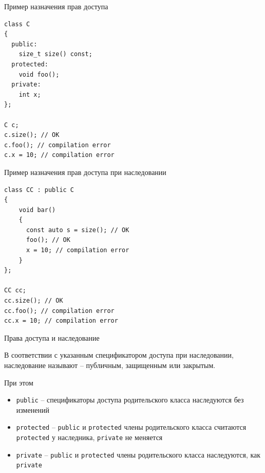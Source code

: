 \documentclass[unknownkeysallowed,xcolor=table]{beamer}
\begin{document}
\begin{frame}[fragile]{Пример назначения прав доступа}

\begin{lstlisting}
class C
{
  public:
    size_t size() const;
  protected:
    void foo();
  private:
    int x;
};

C c;
c.size(); // OK
c.foo(); // compilation error
c.x = 10; // compilation error
\end{lstlisting}

\end{frame}

\begin{frame}[fragile]{Пример назначения прав доступа при наследовании}

\begin{lstlisting}
class CC : public C
{
    void bar()
    {
      const auto s = size(); // OK
      foo(); // OK
      x = 10; // compilation error
    }
};

CC cc;
cc.size(); // OK
cc.foo(); // compilation error
cc.x = 10; // compilation error
\end{lstlisting}

\end{frame}

\begin{frame}{Права доступа и наследование}

В соответствии с указанным спецификатором доступа при наследовании, наследование называют -- публичным, защищенным или закрытым.

\vspace{2em}

При этом
\begin{itemize}
  \item \lstinline{public} -- спецификаторы доступа родительского класса наследуются без изменений \vspace{0.5em}
  \item \lstinline{protected} -- \lstinline{public} и \lstinline{protected} члены родительского класса считаются \lstinline{protected} у наследника, \lstinline{private} не меняется \vspace{0.5em}
  \item \lstinline{private} -- \lstinline{public} и \lstinline{protected} члены родительского класса наследуются, как \lstinline{private}
\end{itemize}

\end{frame}
\end{document}
